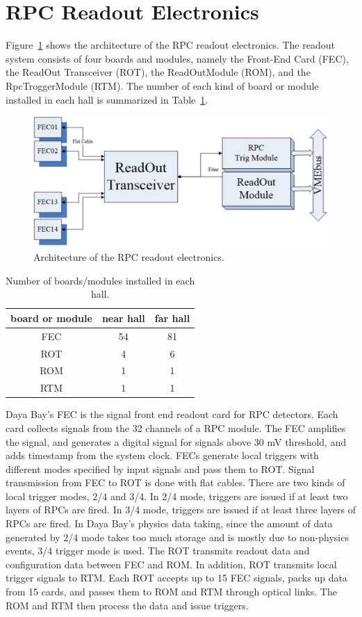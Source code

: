 \section{RPC Readout Electronics}\label{sec:RPC_electronics}
Figure~\ref{fig:RPC_electronics} shows the architecture of the RPC readout electronics. The readout system consists of four boards and modules, namely the Front-End Card (FEC), the ReadOut Transceiver (ROT), the ReadOutModule (ROM), and the RpcTroggerModule (RTM). The number of each kind of board or module installed in each hall is summarized in Table~\ref{table:num_installed}.
\begin{figure}
	\centering
	\includegraphics[width=.75\textwidth]{figures/chap5/RPC_Readout.eps}
	\caption{Architecture of the RPC readout electronics.}
	\label{fig:RPC_electronics}
\end{figure}
\begin{table}
	\centering
	\begin{tabular}{ccc}
		\hline
		board or module & near hall & far hall \\
		\hline
		FEC & 54 & 81 \\
		ROT & 4 & 6 \\
		ROM & 1 & 1 \\
		RTM & 1 & 1 \\
		\hline
	\end{tabular}
	\caption{Number of boards/modules installed in each hall.}
	\label{table:num_installed}
\end{table}
Daya Bay's FEC is the signal front end readout card for RPC detectors. Each card collects signals from the 32 channels of a RPC module. The FEC amplifies the signal, and generates a digital signal for signals above 30 mV threshold, and adds timestamp from the system clock. FECs generate local triggers with different modes specified by input signals and pass them to ROT. Signal transmission from FEC to ROT is done with flat cables. There are two kinds of local trigger modes, 2/4 and 3/4. In 2/4 mode, triggers are issued if at least two layers of RPCs are fired. In 3/4 mode, triggers are issued if at least three layers of RPCs are fired. In Daya Bay's physics data taking, since the amount of data generated by 2/4 mode takes too much storage and is mostly due to non-physics events, 3/4 trigger mode is used.
The ROT transmits readout data and configuration data between FEC and ROM. In addition, ROT transmits local trigger signals to RTM. Each ROT accepts up to 15 FEC signals, packs up data from 15 cards, and passes them to ROM and RTM through optical links. The ROM and RTM then process the data and issue triggers.


